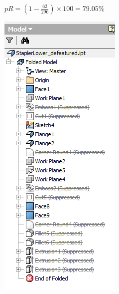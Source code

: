 \begin{minipage}{\linewidth}
\begin{minipage}[c]{0.62\linewidth}
$pR = (1 - \frac{62}{296}) \times 100 = 79.05\%$
\end{minipage}
\quad
\begin{minipage}[c]{0.3\linewidth}
\includegraphics[width=\linewidth,valign=t]{../Common/images/StaplerLower_defeatured_tree}
 \label{fig:results:staplerlowerdefeattree}
\end{minipage}
\end{minipage}


